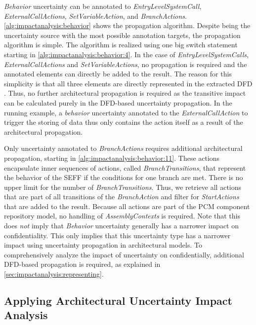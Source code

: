 \emph{Behavior} uncertainty can be annotated to \emph{EntryLevelSystemCall}, \emph{ExternalCallActions}, \emph{SetVariableAction}, and \emph{BranchActions}.
\autoref{alg:impactanalysis:behavior} shows the propagation algorithm.
Despite being the uncertainty source with the most possible annotation targets, the propagation algorithm is simple.
The algorithm is realized using one big switch statement starting in \autoref{alg:impactanalysis:behavior:4}.
In the case of \emph{EntryLevelSystemCalls}, \emph{ExternalCallActions} and \emph{SetVariableActions}, no propagation is required and the annotated elements can directly be added to the result.
The reason for this simplicity is that all three elements are directly represented in the extracted \ac{DFD} \cite{seifermann_architectural_2022}.
Thus, no further architectural propagation is required as the transitive impact can be calculated purely in the \ac{DFD}-based uncertainty propagation.
In the running example, a \emph{behavior} uncertainty annotated to the \emph{ExternalCallAction} to trigger the storing of data thus only contains the action itself as a result of the architectural propagation.

Only uncertainty annotated to \emph{BranchActions} requires additional architectural propagation, starting in \autoref{alg:impactanalysis:behavior:11}.
These actions encapsulate inner sequences of actions, called \emph{BranchTransitions}, that represent the behavior of the \ac{SEFF} if the conditions for one branch are met.
There is no upper limit for the number of \emph{BranchTransitions}.
Thus, we retrieve all actions that are part of all transitions of the \emph{BranchAction} and filter for \emph{StartActions} that are added to the result.
Because all actions are part of the \ac{PCM} component repository model, no handling of \emph{AssemblyContexts} is required.
Note that this does \emph{not} imply that \emph{Behavior} uncertainty generally has a narrower impact on confidentiality.
This only implies that this uncertainty type has a narrower impact using uncertainty propagation in architectural models.
To comprehensively analyze the impact of uncertainty on confidentially, additional \ac{DFD}-based propagation is required, as explained in \autoref{sec:impactanalysis:representing}. 


\subsection{Applying Architectural Uncertainty Impact Analysis}

